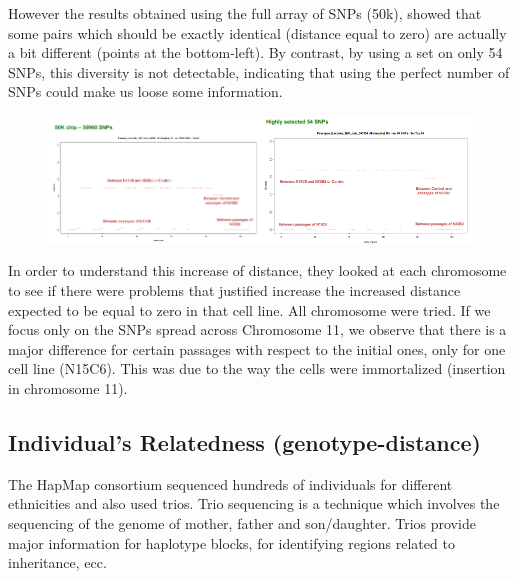 However the results obtained using the full array of SNPs (50k), showed that
some pairs which should be exactly identical (distance equal to zero) are
actually a bit different (points at the bottom-left). By contrast, by using a
set on only 54 SNPs, this diversity is not detectable, indicating  that using
the perfect number of SNPs could make us loose some information. 

\begin{figure}[h]
	\centering
	\includegraphics[width=0.5\textwidth]{cell_lines_1.PNG}\quad\includegraphics[width=0.5\textwidth]{cell_lines_2.PNG}
	\caption{\label{fig: cell_lines}}
\end{figure}

In order to understand this increase of distance, they looked at each chromosome
to see if there were problems that justified increase the increased distance
expected to be equal to zero in that cell line. All chromosome were tried. If we
focus only on the SNPs spread across Chromosome 11, we observe that there is a
major difference for certain passages with respect to the initial ones, only for
one cell line (N15C6). This was due to the way the cells were immortalized
(insertion in chromosome 11).


\subsection{Individual's Relatedness (genotype-distance)}

The HapMap consortium sequenced hundreds of individuals for different
ethnicities and also used trios. Trio sequencing is a technique which involves
the sequencing of the genome of mother, father and son/daughter. Trios provide
major information for haplotype blocks, for identifying regions related to
inheritance, ecc. 

